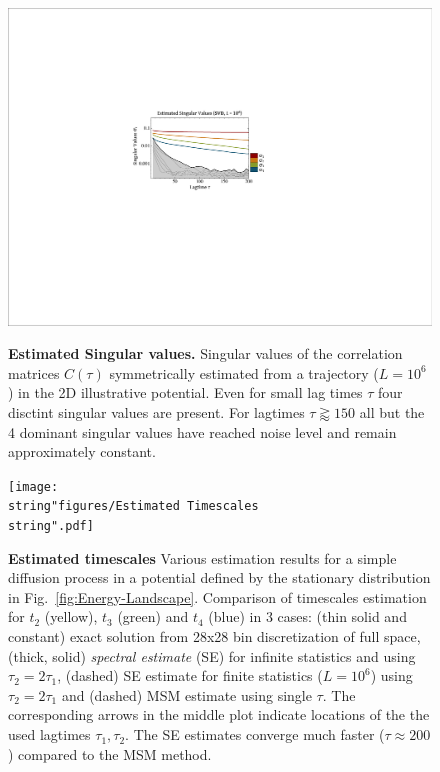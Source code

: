 \documentclass[aps,pre,twocolumn,nofootinbib,superscriptaddress,linenumbers]{revtex4-1}
\begin{document}
\begin{figure}
\includegraphics[width=1\columnwidth]{figures/new_SVD}

\label{fig:Singular-values}\textbf{Estimated Singular values. }Singular
values of the correlation matrices $C(\tau)$ symmetrically estimated
from a trajectory ($L=10^{6}$) in the 2D illustrative potential.
Even for small lag times $\tau$ four disctint singular values are
present. For lagtimes $\tau\gtrapprox150$ all but the 4 dominant
singular values have reached noise level and remain approximately
constant.
\end{figure}


\begin{figure}
\begin{centering}
\texttt{[image: \\string"figures/Estimated Timescales\\string".pdf]}
\par\end{centering}

\centering{}\textbf{\label{fig:Estimation-results}Estimated timescales }Various
estimation results for a simple diffusion process in a potential defined
by the stationary distribution in Fig.~\ref{fig:Energy-Landscape}.
Comparison of timescales estimation for $t_{2}$ (yellow), $t_{3}$
(green) and $t_{4}$ (blue) in 3 cases: (thin solid and constant)
exact solution from 28x28 bin discretization of full space, (thick,
solid) \emph{spectral estimate} (SE) for infinite statistics and using
$\tau_{2}=2\tau_{1}$, (dashed) SE estimate for finite statistics
($L=10^{6}$) using $\tau_{2}=2\tau_{1}$ and (dashed) MSM estimate
using single $\tau$. The corresponding arrows in the middle plot
indicate locations of the the used lagtimes $\tau_{1},\tau_{2}$.
The SE estimates converge much faster ($\tau\approx200$) compared
to the MSM method.
\end{figure}
\end{document}
